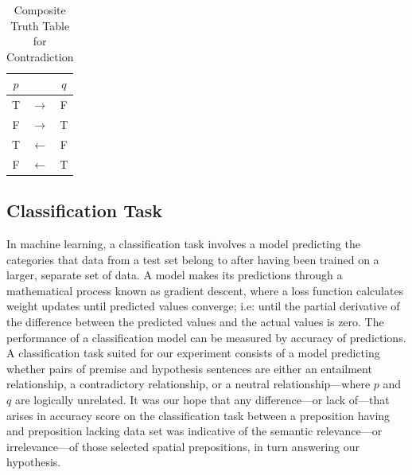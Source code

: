 \documentclass[12pt,letterpaper]{article}
\begin{document}
\begin{table}[h]
\centering
	\begin{tabular}{c c c}
	$p$ &   & $q$\\
	\hline
	T & $\rightarrow$ & F \\
	F & $\rightarrow$ & T\\
    T & $\leftarrow$ & F\\
    F & $\leftarrow$ & T\\
	\hline
	\end{tabular}
\caption{Composite Truth Table for Contradiction \protect\citep[p.~97]{saeed_semantics_2016}}
\label{t:contra_table}
\end{table}





\subsection{Classification Task}
In machine learning, a classification task involves a model predicting the categories that data from a test set belong to after having been trained on a larger, separate set of data. A model makes its predictions through a mathematical process known as gradient descent, where a loss function calculates weight updates until predicted values converge; i.e:  until the partial derivative of the difference between the predicted values and the actual values is zero. The performance of a classification model can be measured by accuracy of predictions. A classification task suited for our experiment consists of a model predicting whether pairs of premise and hypothesis sentences are either an entailment relationship, a contradictory relationship, or a neutral relationship---where $p$ and $q$ are logically unrelated. It was our hope that any difference---or lack of---that arises in accuracy score on the classification task between a preposition having and preposition lacking data set was indicative of the semantic relevance---or irrelevance---of those selected spatial prepositions, in turn answering our hypothesis.
\end{document}
